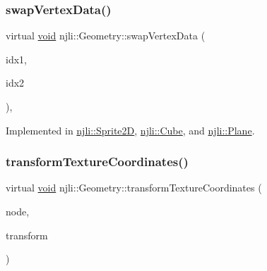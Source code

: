 \mbox{\label{classnjli_1_1_geometry_ac7ee1093062d2f342519f7914852a367}} 
\subsubsection{\texorpdfstring{swap\+Vertex\+Data()}{swapVertexData()}}
{\footnotesize\ttfamily virtual \mbox{\hyperlink{_thread_8h_af1e856da2e658414cb2456cb6f7ebc66}{void}} njli\+::\+Geometry\+::swap\+Vertex\+Data (\begin{DoxyParamCaption}\item[{const size\+\_\+t}]{idx1,  }\item[{const size\+\_\+t}]{idx2 }\end{DoxyParamCaption})\hspace{0.3cm}{\ttfamily [private]}, {}}



Implemented in \mbox{\hyperlink{classnjli_1_1_sprite2_d_a310321527886b81f468aa818812a3347}{njli\+::\+Sprite2D}}, \mbox{\hyperlink{classnjli_1_1_cube_af902a20050d40c642b6c5e7def28cce0}{njli\+::\+Cube}}, and \mbox{\hyperlink{classnjli_1_1_plane_a238e9b9a68bf90b6e7a90119fe852da7}{njli\+::\+Plane}}.

\mbox{\label{classnjli_1_1_geometry_a8ffb29f40c6f175f83cc36568feb87c4}} 
\subsubsection{\texorpdfstring{transform\+Texture\+Coordinates()}{transformTextureCoordinates()}}
{\footnotesize\ttfamily virtual \mbox{\hyperlink{_thread_8h_af1e856da2e658414cb2456cb6f7ebc66}{void}} njli\+::\+Geometry\+::transform\+Texture\+Coordinates (\begin{DoxyParamCaption}\item[{\mbox{\hyperlink{classnjli_1_1_node}{Node}} $\ast$}]{node,  }\item[{const bt\+Transform \&}]{transform }\end{DoxyParamCaption})\hspace{0.3cm}{\ttfamily [pure virtual]}}

